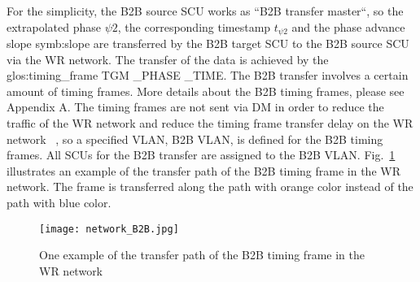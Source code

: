 For the simplicity, the B2B source SCU works as ``B2B transfer master``, so the extrapolated phase $\psi2$, the corresponding timestamp $t_{\psi2}$ and the phase advance slope \gls{symb:slope} are transferred by the B2B target SCU to the B2B source SCU via the WR network. The transfer of the data is achieved by the \gls{glos:timing_frame} TGM \_PHASE \_TIME. The B2B transfer involves a certain amount of timing frames. More details about the B2B timing frames, please see Appendix A. The timing frames are not sent via DM in order to reduce the traffic of the WR network and reduce the timing frame transfer delay on the WR network ~\cite{bai_concept_2016}, so a specified VLAN, B2B \gls{VLAN}, is defined for the B2B timing frames. All SCUs for the B2B transfer are assigned to the B2B VLAN. Fig.~\ref{network_B2B} illustrates an example of the transfer path of the B2B timing frame in the WR network. The frame is transferred along the path with orange color instead of the path with blue color. 
 \begin{figure}[!htb]
   \centering   
   \texttt{[image: network\_B2B.jpg]}
   \caption{One example of the transfer path of the B2B timing frame in the WR network}
   \label{network_B2B}
\end{figure}
